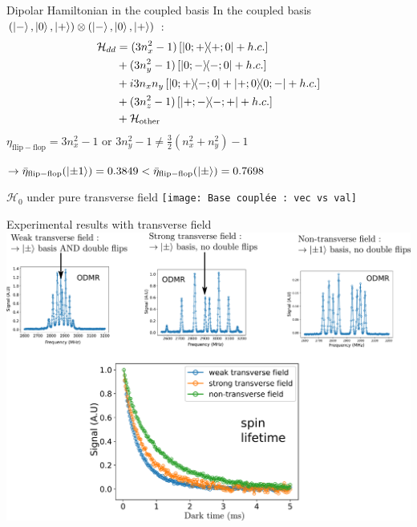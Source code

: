 \documentclass{beamer}
\begin{document}
\begin{frame}{Dipolar Hamiltonian in the coupled basis}
\setcounter{equation}{0}
In the coupled basis $(\ket{-},\ket{0},\ket{+}) \otimes (\ket{-},\ket{0},\ket{+})$ :
\begin{align}
  \mathcal{H}_{dd}&=(3n_x^2-1)\left[\op{0;+}{+;0}+ h.c. \right]\\
  &+(3n_y^2-1)\left[\op{0;-}{-;0}+ h.c. \right]\\
  &+i3n_x n_y\left[\op{0;+}{-;0}+\op{+;0}{0;-} +h.c. \right]\\
  &+(3n_z^2-1)\left[\op{+;-}{-;+}+ h.c.\right]\\
  &+\mathcal{H}_{\mathrm{other}}
  \end{align}
  $\eta_{\mathrm{flip-flop}} = 3n_x^2-1$ or $3n_y^2-1 \neq \frac{3}{2}(n_x^2+n_y^2)-1$ 
  
  \bigskip
  $\to \bar \eta_{\mathrm{flip-flop}}(\ket{\pm 1})=0.3849 < \bar \eta_{\mathrm{flip-flop}}(\ket{\pm})=0.7698$
\end{frame}
\begin{frame}{$\mathcal{H}_0$ under pure transverse field}
\centering
\texttt{[image: Base couplée : vec vs val]}
\end{frame}
\begin{frame}{Experimental results with transverse field}
\centering
\includegraphics[width=\textwidth,height=0.9\textheight,keepaspectratio]{Champ transverse mesures}
\end{frame}
\end{document}
